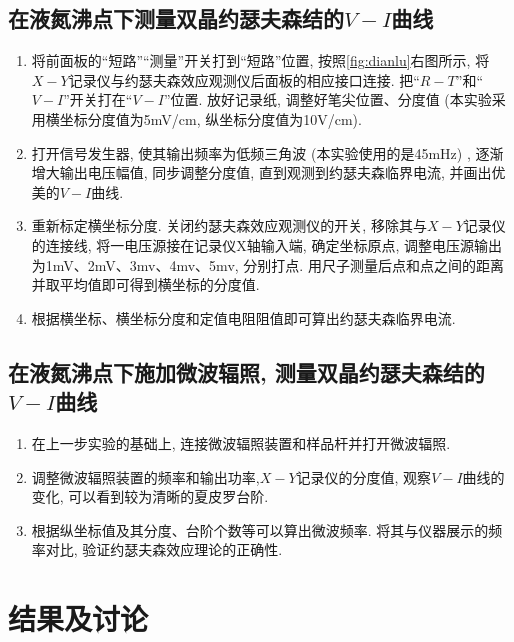 \documentclass[font=default]{mpltx}
\begin{document}
\subsection{在液氮沸点下测量双晶约瑟夫森结的$V-I$曲线}
\begin{enumerate}
  \item 将前面板的“短路”“测量”开关打到“短路”位置, 按照\autoref{fig:dianlu}右图所示, 将$X-Y$记录仪与约瑟夫森效应观测仪后面板的相应接口连接. 把“$R-T$”和“$V-I$”开关打在“$V-I$”位置. 放好记录纸, 调整好笔尖位置、分度值 (本实验采用横坐标分度值为5mV/cm, 纵坐标分度值为10\mu V/cm). 
  \item 打开信号发生器, 使其输出频率为低频三角波 (本实验使用的是45mHz) , 逐渐增大输出电压幅值, 同步调整分度值, 直到观测到约瑟夫森临界电流, 并画出优美的$V-I$曲线.
  \item 重新标定横坐标分度. 关闭约瑟夫森效应观测仪的开关, 移除其与$X-Y$记录仪的连接线, 将一电压源接在记录仪X轴输入端, 确定坐标原点, 调整电压源输出为1mV、2mV、3mv、4mv、5mv, 分别打点. 用尺子测量后点和点之间的距离并取平均值即可得到横坐标的分度值.
  \item 根据横坐标、横坐标分度和定值电阻阻值即可算出约瑟夫森临界电流.
  
\end{enumerate}



\subsection{在液氮沸点下施加微波辐照, 测量双晶约瑟夫森结的$V-I$曲线}
\begin{enumerate}
  \item 在上一步实验的基础上, 连接微波辐照装置和样品杆并打开微波辐照.
  \item 调整微波辐照装置的频率和输出功率,$X-Y$记录仪的分度值, 观察$V-I$曲线的变化, 可以看到较为清晰的夏皮罗台阶.
  \item 根据纵坐标值及其分度、台阶个数等可以算出微波频率. 将其与仪器展示的频率对比, 验证约瑟夫森效应理论的正确性.
\end{enumerate}


\section{结果及讨论}
\end{document}
